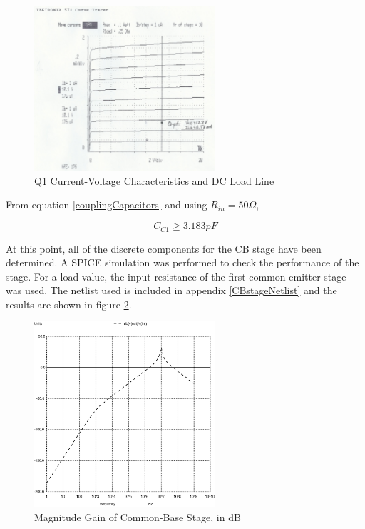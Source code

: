 \documentclass[titlepage, letterpaper, 11pt]{article}
\begin{document}
\begin{figure}[ht]
	\centering
	\includegraphics[width=0.6\textwidth]
		{measurements/q1Characteristics}
	\caption{
		Q1 Current-Voltage Characteristics and DC Load Line
	}
	\label{q1Characteristics}
\end{figure}

From equation \ref{couplingCapacitors} and using $R_{in}=50\Omega$,

\begin{equation*}
C_{C1}\geq 3.183pF
\end{equation*}

At this point, all of the discrete components for the CB stage have
been determined. A SPICE simulation was performed to check the
performance of the stage. For a load value, the input resistance of
the first common emitter stage was used. The netlist used is included
in appendix \ref{CBstageNetlist} and the results are shown in figure
\ref{CBstageMagnitudePlot}.

\begin{figure}[ht]
	\centering
	\includegraphics[width=0.6\textwidth]
		{ngspice/CBstage.eps}
	\caption{
		Magnitude Gain of Common-Base Stage, in dB
	}
	\label{CBstageMagnitudePlot}
\end{figure}
\end{document}
